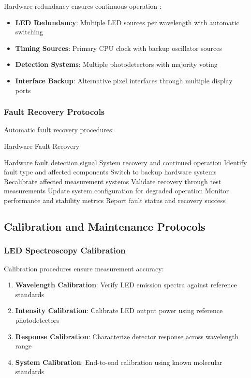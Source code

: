 Hardware redundancy ensures continuous operation \cite{avizienis2004basic}:

\begin{itemize}
\item \textbf{LED Redundancy}: Multiple LED sources per wavelength with automatic switching
\item \textbf{Timing Sources}: Primary CPU clock with backup oscillator sources  
\item \textbf{Detection Systems}: Multiple photodetectors with majority voting
\item \textbf{Interface Backup}: Alternative pixel interfaces through multiple display ports
\end{itemize}

\subsubsection{Fault Recovery Protocols}

Automatic fault recovery procedures:

\begin{algorithm}[H]
\caption{Hardware Fault Recovery}
\begin{algorithmic}[1]
\REQUIRE Hardware fault detection signal
\ENSURE System recovery and continued operation
\STATE Identify fault type and affected components
\STATE Switch to backup hardware systems
\STATE Recalibrate affected measurement systems
\STATE Validate recovery through test measurements
\STATE Update system configuration for degraded operation
\STATE Monitor performance and stability metrics
\STATE Report fault status and recovery success
\end{algorithmic}
\end{algorithm}

\subsection{Calibration and Maintenance Protocols}

\subsubsection{LED Spectroscopy Calibration}

Calibration procedures ensure measurement accuracy:

\begin{enumerate}
\item \textbf{Wavelength Calibration}: Verify LED emission spectra against reference standards
\item \textbf{Intensity Calibration}: Calibrate LED output power using reference photodetectors
\item \textbf{Response Calibration}: Characterize detector response across wavelength range
\item \textbf{System Calibration}: End-to-end calibration using known molecular standards
\end{enumerate}


